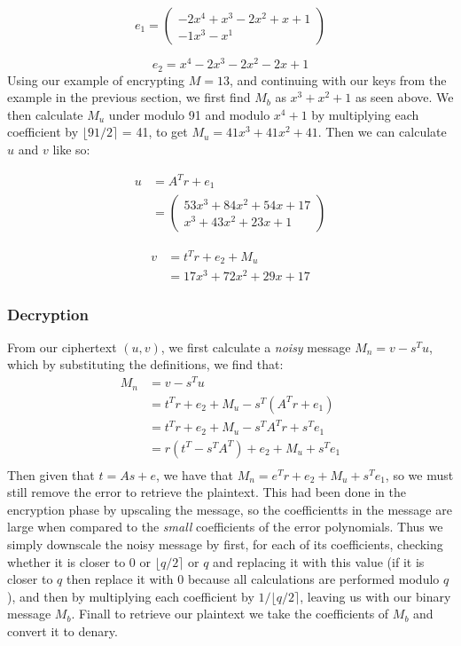 \documentclass{article}
\newcommand{\round}[1]{\ensuremath{\lfloor#1\rceil}}
\begin{document}
\[
   e_{1} = \begin{pmatrix}
            -2x^4 + x^3 -2x^2 + x + 1 \\
            -1x^3 -x^1
           \end{pmatrix}
\]

\[
   e_{2} = x^4 -2x^3 -2x^2 -2x + 1
\]
Using our example of encrypting $M = 13$, and continuing with our keys from the example in the previous section, we first find $M_{b}$ as $x^{3} + x^{2} + 1$ as seen above.
We then calculate $M_{u}$ under modulo 91 and modulo $x^4 + 1$ by multiplying each coefficient by $\round{91/2}$ = 41, to get $M_{u} = 41x^3 + 41x^2 + 41$. Then we can calculate $u$ and $v$ like so:

\begin{align*}
u &= A^{T}r + e_{1} \\
&=
\begin{pmatrix}%
53x^3 + 84x^2 + 54x + 17 \\
x^3 + 43x^2 + 23x + 1
\end{pmatrix}
\end{align*}

\begin{align*}
v &= t^{T}r + e_{2} + M_{u} \\
&= 17x^3 + 72x^2 + 29x + 17
\end{align*}

\subsubsection{Decryption}
From our ciphertext $(u, v)$, we first calculate a \textit{noisy} message $M_{n} = v - s^{T}u$,
which by substituting the definitions, we find that:
\begin{align}
   M_{n} &= v - s^{T}u \\
         &= t^{T}r + e_{2} + M_{u} - s^{T}(A^{T}r + e_{1}) \\
         &= t^{T}r + e_{2} + M_{u} - s^{T}A^{T}r + s^{T}e_{1} \\
         &= r(t^{T} - s^{T}A^{T}) + e_{2} + M_{u} + s^{T}e_{1} \\
\end{align}
Then given that $t = As + e$, we have that $M_{n} = e^{T}r + e_{2} + M_{u} + s^{T}e_{1}$, so we must still remove the error to retrieve
the plaintext. This had been done in the encryption phase by upscaling the message, so the coefficientts in the message are large when
compared to the \textit{small} coefficients of the error polynomials. Thus we simply downscale the noisy message by first, for each of its
coefficients, checking whether it is closer to 0 or $\round{q/2}$ or $q$ and replacing it with this value (if it is closer to $q$ then replace
it with 0 because all calculations are performed modulo $q$), and then by multiplying each coefficient by $1/\round{q/2}$, leaving us with
our binary message $M_{b}$. Finall to retrieve our plaintext we take the coefficients of $M_{b}$ and convert it to denary.
\end{document}
